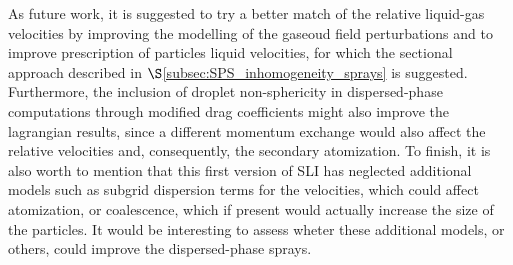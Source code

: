 As future work, it is suggested to try a better match of the relative liquid-gas velocities by improving the modelling of the gaseoud field perturbations and to improve prescription of particles liquid velocities, for which the sectional approach described in $\S$\ref{subsec:SPS_inhomogeneity_sprays} is suggested. Furthermore, the inclusion of droplet non-sphericity in dispersed-phase computations through modified drag coefficients might also improve the lagrangian results, since a different momentum exchange would also affect the relative velocities and, consequently, the secondary atomization. To finish, it is also worth to mention that this first version of SLI has neglected additional models such as subgrid dispersion terms for the velocities, which could affect atomization, or coalescence, which if present would actually increase the size of the particles. It would be interesting to assess wheter these additional models, or others, could improve the dispersed-phase sprays.




\clearpage

